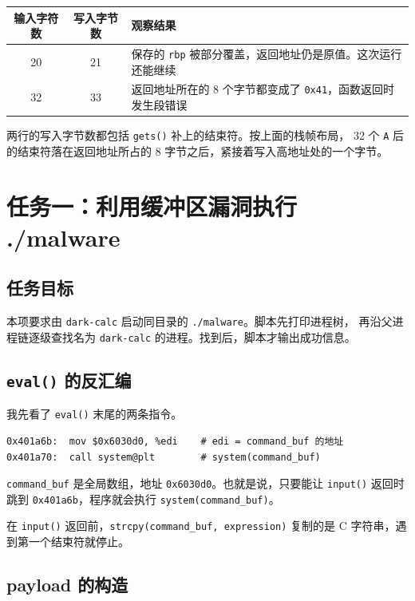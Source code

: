 \documentclass[UTF8,a4paper,12pt,fontset=windows]{ctexart}
\newcommand{\code}[1]{\texttt{#1}}
\begin{document}
\begin{center}
\begin{tabular}{|c|c|p{6.6cm}|}
\hline
输入字符数 & 写入字节数 & 观察结果 \\
\hline
20 & 21 & 保存的 \code{rbp} 被部分覆盖，返回地址仍是原值。这次运行还能继续 \\
\hline
32 & 33 & 返回地址所在的 8 个字节都变成了 \code{0x41}，函数返回时发生段错误 \\
\hline
\end{tabular}
\end{center}

两行的写入字节数都包括 \code{gets()} 补上的结束符。按上面的栈帧布局，
32 个 \code{A} 后的结束符落在返回地址所占的 8 字节之后，紧接着写入高地址处的一个字节。

\section{任务一：利用缓冲区漏洞执行 ./malware}

\subsection{任务目标}

本项要求由 \code{dark-calc} 启动同目录的 \code{./malware}。脚本先打印进程树，
再沿父进程链逐级查找名为 \code{dark-calc} 的进程。找到后，脚本才输出成功信息。

\subsection{\texorpdfstring{\code{eval()}}{eval()} 的反汇编}

我先看了 \code{eval()} 末尾的两条指令。

\begin{lstlisting}
0x401a6b:  mov $0x6030d0, %edi    # edi = command_buf 的地址
0x401a70:  call system@plt        # system(command_buf)
\end{lstlisting}

\code{command\_buf} 是全局数组，地址 \code{0x6030d0}。也就是说，只要能让
\code{input()} 返回时跳到 \code{0x401a6b}，程序就会执行 \code{system(command\_buf)}。

在 \code{input()} 返回前，\code{strcpy(command\_buf, expression)} 复制的是
C 字符串，遇到第一个结束符就停止。

\subsection{payload 的构造}
\end{document}
